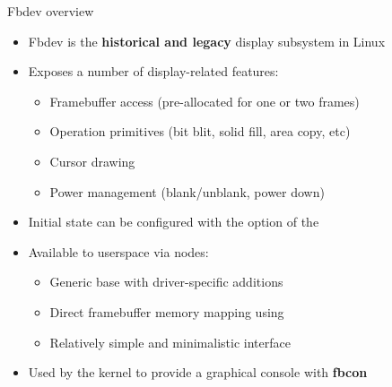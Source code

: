\begin{frame}{Fbdev overview}
  \begin{itemize}
  \item Fbdev is the \textbf{historical and legacy} display subsystem in Linux
  \item Exposes a number of display-related features:
    \begin{itemize}
    \item Framebuffer access (pre-allocated for one or two frames)
    \item Operation primitives (bit blit, solid fill, area copy, etc)
    \item Cursor drawing
    \item Power management (blank/unblank, power down)
    \end{itemize}
  \item Initial state can be configured with the  option of the 
  \item Available to userspace via  nodes:
    \begin{itemize}
    \item Generic base  with driver-specific additions
    \item Direct framebuffer memory mapping using 
    \item Relatively simple and minimalistic interface
    \end{itemize}
  \item Used by the kernel to provide a graphical console with \textbf{fbcon}
  \end{itemize}
\end{frame}

